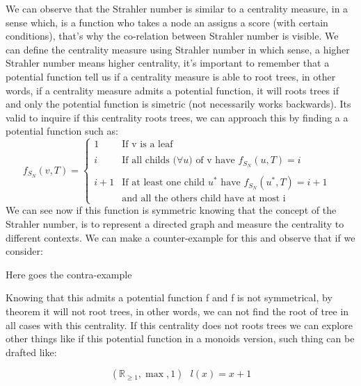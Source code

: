 
We can observe that the Strahler number is similar to a centrality measure, in a sense which, is a function who takes a node an assigns a score (with certain conditions), that's why the co-relation between Strahler number is visible. We can define the centrality measure using Strahler number in which sense, a higher Strahler number means higher centrality, it's important to remember that a potential function tell us if a centrality measure is able to root trees, in other words, if a centrality measure admits a potential function, it will roots trees if and only the potential function is simetric (not necessarily works backwards). Its valid to inquire if this centrality roots trees, we can approach this by finding a a potential function such as:
    \begin{equation}
        f_{S_{N}} (v,T) = \left\{ \begin{array}{llc}
             1 &   \text{If v is a leaf}  &\\
             \\ i & \text{If all childs ($\forall u)$ of v have $f_{S_{N}} (u,T) = i$} \\
             \\ i + 1 &  \text{If at least one child $u^{
             *}$ have $f_{S_{N}} (u^{*},T) = i+1$} \\
         & \text{and all the others child  have at most i} 
             \end{array}
   \right.
    \end{equation}
We can see now if this function is symmetric knowing that the concept of the Strahler number, is to represent a directed graph and measure the centrality to different contexts. We can make a counter-example for this and observe that if we consider:

Here goes the contra-example
\begin{center}
    
\end{center}

Knowing that this admits a potential function f and f is not symmetrical, by theorem it will not root trees, in other words, we can not find the root of tree in all cases with this centrality. If this centrality does not roots trees we can explore other things like if this potential function in a monoids version, such thing can be drafted like:
\begin{center}
    \begin{equation}
        (\mathbb R_{\geq 1},\max,1)                \text{  $l(x) = x + 1$} 
    \end{equation}
\end{center}

